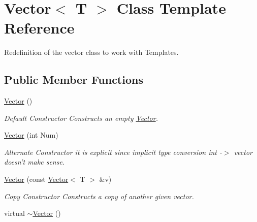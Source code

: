 \hypertarget{class_vector}{\section{Vector$<$ T $>$ Class Template Reference}
\label{class_vector}
}


Redefinition of the vector class to work with Templates.  


\subsection*{Public Member Functions}
\begin{DoxyCompactItemize}
\item 
\hypertarget{class_vector_a39d6069675db4ecfc1ab81d440da759a}{\hyperlink{class_vector_a39d6069675db4ecfc1ab81d440da759a}{Vector} ()}\label{class_vector_a39d6069675db4ecfc1ab81d440da759a}

\begin{DoxyCompactList}\small\item\em Default Constructor Constructs an empty \hyperlink{class_vector}{Vector}. \end{DoxyCompactList}\item 
\hyperlink{class_vector_a5eafc5059eab851fa32ab28dd54c1b4b}{Vector} (int Num)
\begin{DoxyCompactList}\small\item\em Alternate Constructor it is explicit since implicit type conversion int -\/$>$ vector doesn't make sense. \end{DoxyCompactList}\item 
\hyperlink{class_vector_aa1671acb623cf2259dd60cf81db4f56a}{Vector} (const \hyperlink{class_vector}{Vector}$<$ T $>$ \&v)
\begin{DoxyCompactList}\small\item\em Copy Constructor Constructs a copy of another given vector. \end{DoxyCompactList}\item 
\hypertarget{class_vector_afd524fac19e6d3d69db5198ffe2952b0}{virtual \hyperlink{class_vector_afd524fac19e6d3d69db5198ffe2952b0}{$\sim$\-Vector} ()}\label{class_vector_afd524fac19e6d3d69db5198ffe2952b0}


\end{DoxyCompactItemize}
